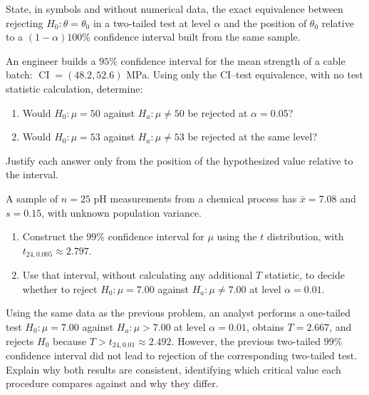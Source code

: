 \begin{problema}\label{prob:43cddbb}
State, in symbols and without numerical data, the exact equivalence between rejecting $H_0:\theta=\theta_0$ in a two-tailed test at level $\alpha$ and the position of $\theta_0$ relative to a $(1-\alpha)100\%$ confidence interval built from the same sample.
\end{problema}

\begin{problema}\label{prob:ae1a813}
An engineer builds a $95\%$ confidence interval for the mean strength of a cable batch: $\operatorname{CI}=(48.2,52.6)$ MPa. Using only the CI--test equivalence, with no test statistic calculation, determine:
\begin{enumerate}[label=(\alph*)]
	\item Would $H_0:\mu=50$ against $H_a:\mu\ne50$ be rejected at $\alpha=0.05$?
	\item Would $H_0:\mu=53$ against $H_a:\mu\ne53$ be rejected at the same level?
\end{enumerate}
Justify each answer only from the position of the hypothesized value relative to the interval.
\end{problema}

\begin{problema}\label{prob:1b375b0}
A sample of $n=25$ pH measurements from a chemical process has $\bar x=7.08$ and $s=0.15$, with unknown population variance.
\begin{enumerate}[label=(\alph*)]
	\item Construct the $99\%$ confidence interval for $\mu$ using the $t$ distribution, with $t_{24,0.005}\approx2.797$.
	\item Use that interval, without calculating any additional $T$ statistic, to decide whether to reject $H_0:\mu=7.00$ against $H_a:\mu\ne7.00$ at level $\alpha=0.01$.
\end{enumerate}
\end{problema}

\begin{problema}\label{prob:6517bf1}
Using the same data as the previous problem, an analyst performs a one-tailed test $H_0:\mu=7.00$ against $H_a:\mu>7.00$ at level $\alpha=0.01$, obtains $T=2.667$, and rejects $H_0$ because $T>t_{24,0.01}\approx2.492$. However, the previous two-tailed $99\%$ confidence interval did not lead to rejection of the corresponding two-tailed test. Explain why both results are consistent, identifying which critical value each procedure compares against and why they differ.
\end{problema}

